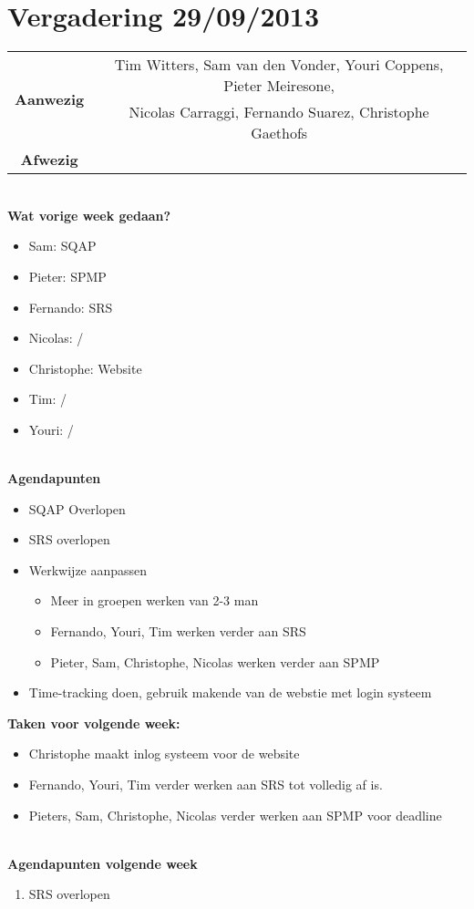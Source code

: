 \section{Vergadering 29/09/2013}

\begin{table}[htbp]
	\centering
	\begin{tabular}{c|c}
		\multirow{2}{*}{\textbf{Aanwezig}} & Tim Witters, Sam van den Vonder, Youri Coppens, Pieter Meiresone, \\
		& Nicolas Carraggi,  Fernando Suarez, Christophe Gaethofs \\
		\hline
		\textbf{Afwezig} &  \\
	\end{tabular}
\end{table}
\mbox{} 
\\
\textbf{Wat vorige week gedaan?} \\
\begin{itemize}
	\item Sam: SQAP
	\item Pieter: SPMP
	\item Fernando: SRS
	\item Nicolas: /
	\item Christophe: Website
	\item Tim: /
	\item Youri: /
\end{itemize}
\mbox{} 
\\
\noindent \textbf{Agendapunten} \\
\begin{itemize}
	\item SQAP Overlopen
	\item SRS overlopen
	\item Werkwijze aanpassen
	\begin{itemize}
		\item Meer in groepen werken van 2-3 man
		\item Fernando, Youri, Tim werken verder aan SRS
		\item Pieter, Sam, Christophe, Nicolas werken verder aan SPMP
	\end{itemize}
	\item Time-tracking doen, gebruik makende van de webstie met login systeem
\end{itemize}

\noindent \textbf{Taken voor volgende week:} \\
\begin{itemize}
	\item Christophe maakt inlog systeem voor de website
	\item Fernando, Youri, Tim verder werken aan SRS tot volledig af is.
	\item Pieters, Sam, Christophe, Nicolas verder werken aan SPMP voor deadline
\end{itemize}
\mbox{} 
\\
\textbf{Agendapunten volgende week} \\
\begin{enumerate}
	\item SRS overlopen
\end{enumerate}

